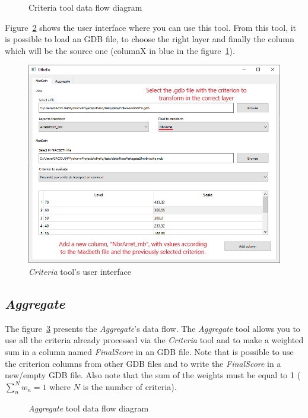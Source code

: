 \documentclass[11pt]{article}
\begin{document}
\begin{figure}[H]
    \centering
    
    \caption{Criteria tool data flow diagram}
    \label{fig:criteria-tool}
\end{figure}

Figure~\ref{fig:criteria-ui} shows the user interface where you can use this tool.
From this tool, it is possible to load an GDB file,
to choose the right layer and finally the column which will be the source one
(columnX in blue in the figure~\ref{fig:criteria-tool}).

\begin{figure}[H]
    \centering
    \includegraphics[width=.8\linewidth]{../images/criteria_tool.png}
    \caption{\textit{Criteria} tool's user interface}
    \label{fig:criteria-ui}
\end{figure}

\subsection{\textit{Aggregate}}\label{subsec:aggregate}

The figure\ \ref{fig:aggregate-tool} presents the \textit{Aggregate}'s data flow.
The \textit{Aggregate} tool allows you to use all the criteria
already processed via the \textit{Criteria} tool and to make a weighted
sum in a column named \textit{FinalScore} in an GDB file.
Note that is possible to use the criterion columns from other GDB files and to write the
\textit{FinalScore} in a new/empty GDB file.
Also note that the sum of the weights must be equal to 1
($\sum_n^N w_n = 1$ where $N$ is the number of criteria).

\begin{figure}[H]
    \centering
    
    \caption{\textit{Aggregate} tool data flow diagram}
    \label{fig:aggregate-tool}
\end{figure}
\end{document}
